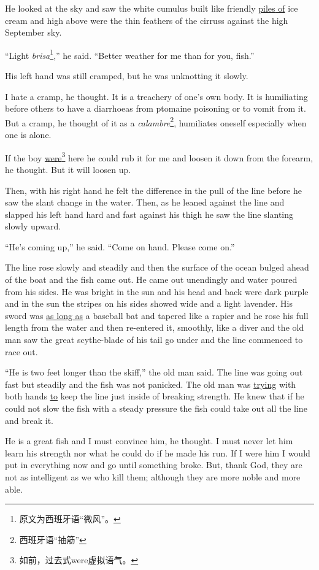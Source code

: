 He looked at the sky and saw the white \gls{cumulus} built like friendly
\uline{\glspl{pile} of} ice cream and high above were the thin \glspl{feather} of
the \glspl{cirrus} against the high September sky.

``Light \emph{brisa}\footnote{原文为西班牙语“微风”。},'' he said. ``Better
weather for me than for you, fish.''

His left hand was still cramped, but he was \gls{unknotting} it slowly.

I hate a cramp, he thought. It is a treachery of one's own body. It is
\gls{humiliating} before others to have a \glspl{diarrhoea} from
\gls{ptomaine} poisoning or to \gls{vomit} from it. But a cramp, he
thought of it as a \emph{calambre}\footnote{西班牙语“抽筋”}, humiliates oneself
especially when one is alone.

If the boy \uline{were}\footnote{如前，过去式were虚拟语气。} here he could \gls{rub}
it for me and \gls{loosen} it down from the \gls{forearm}, he thought. But
it will loosen up.

Then, with his right hand he felt the difference in the pull of the line
before he saw the slant change in the water. Then, as he leaned against the
line and slapped his left hand hard and fast against his \gls{thigh} he saw the
line slanting slowly upward.

``He's coming up,'' he said. ``Come on hand. Please come on.''

The line rose slowly and steadily and then the surface of the ocean
\gls{bulged} ahead of the boat and the fish came out. He came out
\gls{unendingly} and water \gls{poured} from his sides. He was bright in the
sun and his head and back were dark purple and in the sun the stripes on his
sides showed wide and a light lavender. His sword was \uline{as long as} a baseball
\gls{bat} and \gls{tapered} like a rapier and he rose his full length from
the water and then re-entered it, \gls{smoothly}, like a diver and the old
man saw the great scythe-blade of his tail go under and the line commenced
to race out.

``He is two feet longer than the skiff,'' the old man said. The line was
going out fast but steadily and the fish was not \gls{panicked}. The old man
was \uline{trying} with both hands \uline{to} keep the line just inside of
breaking strength. He knew that if he could not slow the fish with a steady
pressure the fish could take out all the line and break it.

He is a great fish and I must \gls{convince} him, he thought. I must never
let him learn his strength nor what he could do if he made his run. If I
were him I would put in everything now and go until something broke. But,
thank God, they are not as \gls{intelligent} as we who kill them; although
they are more \gls{noble} and more \gls{able}.

